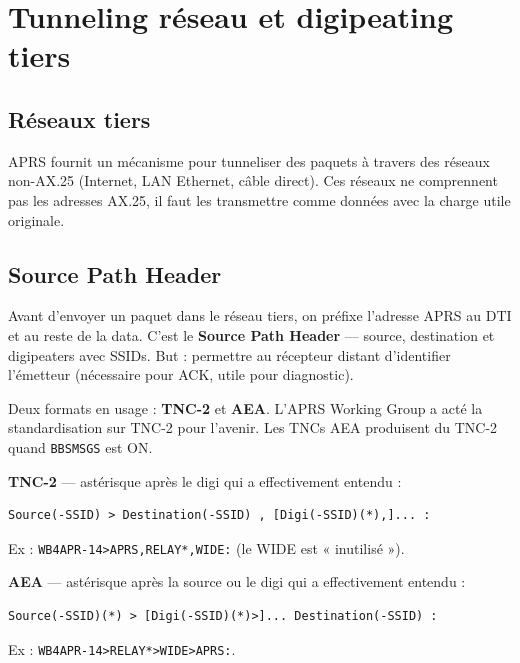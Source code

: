 \chapter[TUNNELING RÉSEAU ET DIGIPEATING TIERS]{Tunneling réseau et digipeating
tiers}\label{tunneling-ruxe9seau-et-digipeating-tiers}

\section{Réseaux tiers}\label{ruxe9seaux-tiers}

APRS fournit un mécanisme pour tunneliser des paquets à travers des
réseaux non-AX.25 (Internet, LAN Ethernet, câble direct). Ces réseaux ne
comprennent pas les adresses AX.25, il faut les transmettre comme
données avec la charge utile originale.

\section{Source Path Header}\label{source-path-header}

Avant d'envoyer un paquet dans le réseau tiers, on préfixe l'adresse
APRS au DTI et au reste de la data. C'est le \textbf{Source Path Header}
--- source, destination et digipeaters avec SSIDs. But : permettre au
récepteur distant d'identifier l'émetteur (nécessaire pour ACK, utile
pour diagnostic).

Deux formats en usage : \textbf{TNC-2} et \textbf{AEA}. L'APRS Working
Group a acté la standardisation sur TNC-2 pour l'avenir. Les TNCs AEA
produisent du TNC-2 quand \texttt{BBSMSGS} est ON.

\textbf{TNC-2} --- astérisque après le digi qui a effectivement entendu
:

\begin{verbatim}
Source(-SSID) > Destination(-SSID) , [Digi(-SSID)(*),]... :
\end{verbatim}

Ex : \texttt{WB4APR-14\textgreater{}APRS,RELAY*,WIDE:} (le WIDE est «
inutilisé »).

\textbf{AEA} --- astérisque après la source ou le digi qui a
effectivement entendu :

\begin{verbatim}
Source(-SSID)(*) > [Digi(-SSID)(*)>]... Destination(-SSID) :
\end{verbatim}

Ex :
\texttt{WB4APR-14\textgreater{}RELAY*\textgreater{}WIDE\textgreater{}APRS:}.

